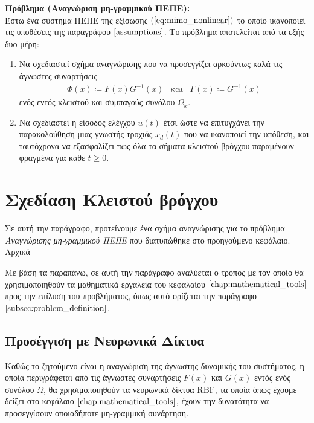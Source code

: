 \textbf{Πρόβλημα (Αναγνώριση μη-γραμμικού ΠΕΠΕ):}\\
Έστω ένα σύστημα ΠΕΠΕ της εξίσωσης $(\ref{eq:mimo_nonlinear})$ το οποίο ικανοποιεί τις υποθέσεις της παραγράφου $\ref{assumptions}$. Το πρόβλημα αποτελείται από τα εξής δυο μέρη:
\begin{enumerate}
	\item Να σχεδιαστεί σχήμα αναγνώρισης που να προσεγγίζει αρκούντως καλά τις άγνωστες συναρτήσεις 
	\begin{equation*}
		\begin{matrix}
		\Phi(x) \coloneqq F(x)G^{-1}(x) & \text{και} & 
		\Gamma(x) \coloneqq G^{-1}(x)
		\end{matrix}
	\end{equation*}
	ενός εντός κλειστού και συμπαγούς συνόλου $\Omega_x$.

	\item Να σχεδιαστεί η είσοδος ελέγχου $u(t)$ έτσι ώστε να επιτυγχάνει την παρακολούθηση μιας γνωστής τροχιάς $x_d(t)$ που να ικανοποιεί την υπόθεση, και ταυτόχρονα να εξασφαλίζει πως όλα τα σήματα κλειστού βρόγχου παραμένουν φραγμένα για κάθε $t \geq 0$.
\end{enumerate}

\section{Σχεδίαση Κλειστού βρόγχου}
Σε αυτή την παράγραφο, προτείνουμε ένα σχήμα αναγνώρισης για το πρόβλημα \textit{Αναγνώρισης μη-γραμμικού ΠΕΠΕ} που διατυπώθηκε στο προηγούμενο κεφάλαιο. Αρχικά 


Με βάση τα παραπάνω, σε αυτή την παράγραφο αναλύεται ο τρόπος με τον οποίο θα χρησιμοποιηθούν τα μαθηματικά εργαλεία του κεφαλαίου $\ref{chap:mathematical_tools}$ προς την επίλυση του προβλήματος, όπως αυτό ορίζεται την παράγραφο $\ref{subsec:problem_definition}$.

\subsection{Προσέγγιση με Νευρωνικά Δίκτυα}
Καθώς το ζητούμενο είναι η αναγνώριση της άγνωστης δυναμικής του συστήματος, η οποία περιγράφεται από τις άγνωστες συναρτήσεις $F(x)$ και $G(x)$ εντός ενός συνόλου $\Omega$, θα χρησιμοποιηθούν τα νευρωνικά δίκτυα RBF, τα οποία όπως έχουμε δείξει στο κεφάλαιο $\ref{chap:mathematical_tools}$, έχουν την δυνατότητα να προσεγγίσουν οποιαδήποτε μη-γραμμική συνάρτηση.

